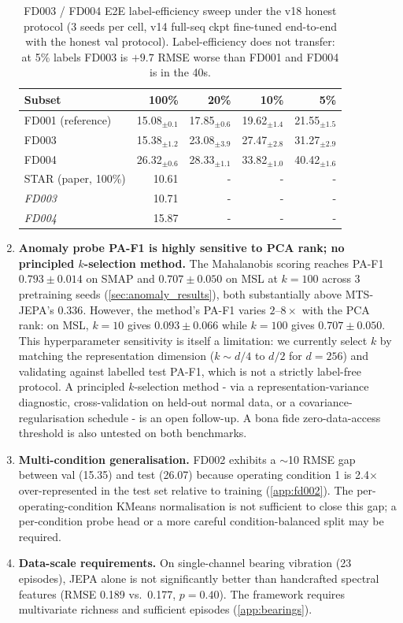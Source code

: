 \documentclass{article}
\begin{document}
\begin{enumerate}[nosep]
\begin{table}[h]
\centering
\caption{FD003 / FD004 E2E label-efficiency sweep under the v18 honest protocol (3 seeds per cell, v14 full-seq ckpt fine-tuned end-to-end with the honest val protocol). Label-efficiency does not transfer: at 5\% labels FD003 is $+9.7$ RMSE worse than FD001 and FD004 is in the 40s.}
\label{tab:fd003_fd004_labels}
\small
\begin{tabular}{@{}lrrrr@{}}
\toprule
Subset & 100\% & 20\% & 10\% & 5\% \\
\midrule
FD001 (reference) & 15.08$_{\pm0.1}$ & 17.85$_{\pm0.6}$ & 19.62$_{\pm1.4}$ & 21.55$_{\pm1.5}$ \\
FD003 & 15.38$_{\pm1.2}$ & 23.08$_{\pm3.9}$ & 27.47$_{\pm2.8}$ & 31.27$_{\pm2.9}$ \\
FD004 & 26.32$_{\pm0.6}$ & 28.33$_{\pm1.1}$ & 33.82$_{\pm1.0}$ & 40.42$_{\pm1.6}$ \\
\midrule
STAR (paper, 100\%) & 10.61 & - & - & - \\
\phantom{STAR (paper, 100\%)}\textit{FD003} & 10.71 & - & - & - \\
\phantom{STAR (paper, 100\%)}\textit{FD004} & 15.87 & - & - & - \\
\bottomrule
\end{tabular}
\end{table}
  \item \textbf{Anomaly probe PA-F1 is highly sensitive to PCA rank; no principled $k$-selection method.} The Mahalanobis scoring reaches PA-F1 $0.793 \pm 0.014$ on SMAP and $0.707 \pm 0.050$ on MSL at $k=100$ across 3 pretraining seeds (\cref{sec:anomaly_results}), both substantially above MTS-JEPA's $0.336$. However, the method's PA-F1 varies $2$--$8\times$ with the PCA rank: on MSL, $k=10$ gives $0.093 \pm 0.066$ while $k=100$ gives $0.707 \pm 0.050$. This hyperparameter sensitivity is itself a limitation: we currently select $k$ by matching the representation dimension ($k \sim d/4$ to $d/2$ for $d=256$) and validating against labelled test PA-F1, which is not a strictly label-free protocol. A principled $k$-selection method - via a representation-variance diagnostic, cross-validation on held-out normal data, or a covariance-regularisation schedule - is an open follow-up. A bona fide zero-data-access threshold is also untested on both benchmarks.
  \item \textbf{Multi-condition generalisation.} FD002 exhibits a $\sim$10 RMSE gap between val (15.35) and test (26.07) because operating condition 1 is 2.4$\times$ over-represented in the test set relative to training (\cref{app:fd002}). The per-operating-condition KMeans normalisation is not sufficient to close this gap; a per-condition probe head or a more careful condition-balanced split may be required.
  \item \textbf{Data-scale requirements.} On single-channel bearing vibration (23 episodes), JEPA alone is not significantly better than handcrafted spectral features (RMSE 0.189 vs.\ 0.177, $p = 0.40$). The framework requires multivariate richness and sufficient episodes (\cref{app:bearings}).
\end{enumerate}
\end{document}
